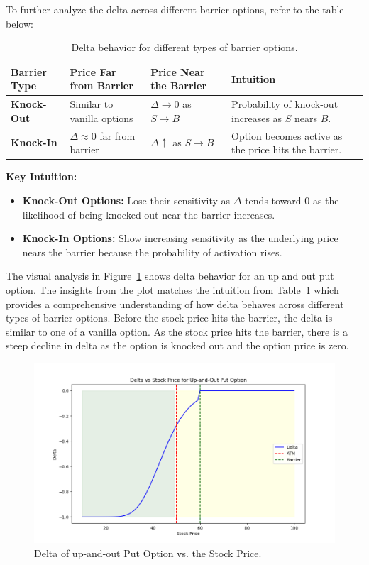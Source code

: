 To further analyze the delta across different barrier options, refer to the table below:
\begin{center}
	\begin{table}[H]
		\begin{tabular}{ | m{3cm} | m{5cm}| m{4cm} | m{4cm}|} 
			\hline
			\textbf{Barrier Type} & \textbf{Price Far from Barrier} & \textbf{Price Near the Barrier} & \textbf{Intuition}  \\
			\hline
			\textbf{Knock-Out} & Similar to vanilla options     & $\Delta \to 0$ as $S \to B$  & Probability of knock-out increases as $S$ nears $B$. \\ 
			\hline
			\textbf{Knock-In}  & $\Delta \approx 0$ far from barrier   & $\Delta \uparrow$ as $S \to B$  & Option becomes active as the price hits the barrier. \\ 
			\hline
		\end{tabular}
		\caption{Delta behavior for different types of barrier options.}
		\label{tab:delta_barrier_options}
	\end{table}
\end{center}
\textbf{Key Intuition:}
\begin{itemize}
	\item \textbf{Knock-Out Options:} Lose their sensitivity as $\Delta$ tends toward $0$ as the likelihood of being knocked out near the barrier increases.
	\item \textbf{Knock-In Options:} Show increasing sensitivity as the underlying price nears the barrier because the probability of activation rises.
\end{itemize}

The visual analysis in Figure~\ref{fig:delta_upout} shows delta behavior for an up and out put option. The insights from the plot matches the intuition from Table~\ref{tab:delta_barrier_options} which provides a comprehensive understanding of how delta behaves across different types of barrier options. Before the stock price hits the barrier, the delta is similar to one of a vanilla option. As the stock price hits the barrier, there is a steep decline in delta as the option is knocked out and the option price is zero.
\begin{figure}[H]
    \centering
    \includegraphics[width=.65\linewidth]{content/images/delta.png}
    \caption{Delta of up-and-out Put Option vs. the Stock Price.}
    \label{fig:delta_upout}
\end{figure}


